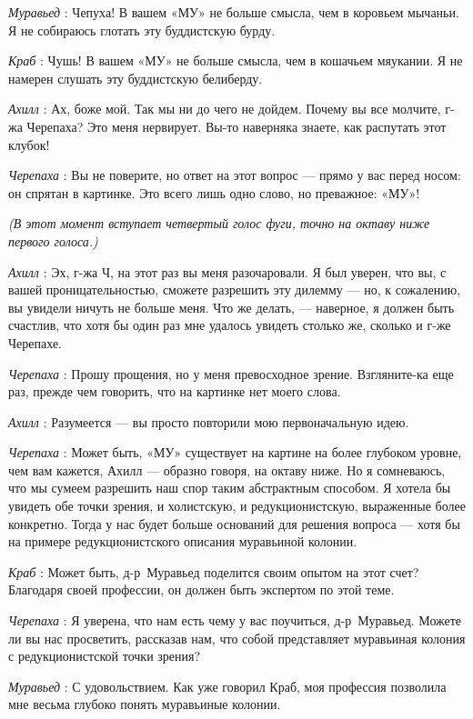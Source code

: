 \documentclass[../main.tex]{subfiles}
\begin{document}
\begin{dialogue}
\emph{Муравьед} : Чепуха! В вашем «МУ» не больше смысла, чем в коровьем мычаньи. Я не собираюсь глотать эту буддистскую бурду.

\emph{Краб} : Чушь! В вашем «МУ» не больше смысла, чем в кошачьем мяукании. Я не намерен слушать эту буддистскую белиберду.

\emph{Ахилл} : Ах, боже мой. Так мы ни до чего не дойдем. Почему вы все молчите, г-жа Черепаха? Это меня нервирует. Вы-то наверняка знаете, как распутать этот клубок!

\emph{Черепаха} : Вы не поверите, но ответ на этот вопрос --- прямо у вас перед носом: он спрятан в картинке. Это всего лишь одно слово, но преважное: «МУ»!

\emph{(В этот момент вступает четвертый голос фуги, точно на октаву ниже первого голоса.)}

\emph{Ахилл} : Эх, г-жа Ч, на этот раз вы меня разочаровали. Я был уверен, что вы, с вашей проницательностью, сможете разрешить эту дилемму --- но, к сожалению, вы увидели ничуть не больше меня. Что же делать, --- наверное, я должен быть счастлив, что хотя бы один раз мне удалось увидеть столько же, сколько и г-же Черепахе.

\emph{Черепаха} : Прошу прощения, но у меня превосходное зрение. Взгляните-ка еще раз, прежде чем говорить, что на картинке нет моего слова.

\emph{Ахилл} : Разумеется --- вы просто повторили мою первоначальную идею.

\emph{Черепаха} : Может быть, «МУ» существует на картине на более глубоком уровне, чем вам кажется, Ахилл --- образно говоря, на октаву ниже. Но я сомневаюсь, что мы сумеем разрешить наш спор таким абстрактным способом. Я хотела бы увидеть обе точки зрения, и холистскую, и редукционистскую, выраженные более конкретно. Тогда у нас будет больше оснований для решения вопроса --- хотя бы на примере редукционистского описания муравьиной колонии.

\emph{Краб} : Может быть, д-р~Муравьед поделится своим опытом на этот счет? Благодаря своей профессии, он должен быть экспертом по этой теме.

\emph{Черепаха} : Я уверена, что нам есть чему у вас поучиться, д-р~Муравьед. Можете ли вы нас просветить, рассказав нам, что собой представляет муравьиная колония с редукционистской точки зрения?

\emph{Муравьед} : С удовольствием. Как уже говорил Краб, моя профессия позволила мне весьма глубоко понять муравьиные колонии.


\end{dialogue}
\end{document}

